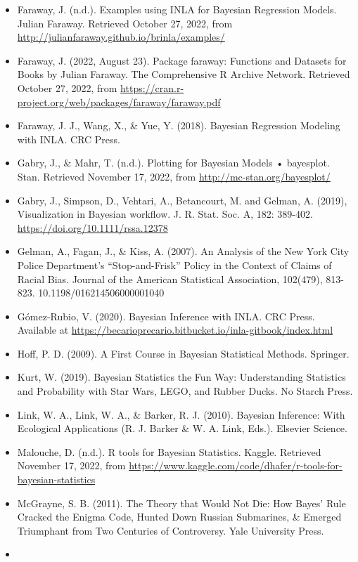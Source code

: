 \documentclass[
]{book}
\begin{document}
\begin{itemize}
\item
  Faraway, J. (n.d.). Examples using INLA for Bayesian Regression Models. Julian Faraway. Retrieved October 27, 2022, from \url{http://julianfaraway.github.io/brinla/examples/}
\item
  Faraway, J. (2022, August 23). Package faraway: Functions and Datasets for Books by Julian Faraway. The Comprehensive R Archive Network. Retrieved October 27, 2022, from \url{https://cran.r-project.org/web/packages/faraway/faraway.pdf}
\item
  Faraway, J. J., Wang, X., \& Yue, Y. (2018). Bayesian Regression Modeling with INLA. CRC Press.
\item
  Gabry, J., \& Mahr, T. (n.d.). Plotting for Bayesian Models • bayesplot. Stan. Retrieved November 17, 2022, from \url{http://mc-stan.org/bayesplot/}
\item
  Gabry, J., Simpson, D., Vehtari, A., Betancourt, M. and Gelman, A. (2019), Visualization in Bayesian workflow. J. R. Stat. Soc. A, 182: 389-402. \url{https://doi.org/10.1111/rssa.12378}
\item
  Gelman, A., Fagan, J., \& Kiss, A. (2007). An Analysis of the New York City Police Department's ``Stop-and-Frisk'' Policy in the Context of Claims of Racial Bias. Journal of the American Statistical Association, 102(479), 813-823. 10.1198/016214506000001040
\item
  Gómez-Rubio, V. (2020). Bayesian Inference with INLA. CRC Press. Available at \url{https://becarioprecario.bitbucket.io/inla-gitbook/index.html}
\item
  Hoff, P. D. (2009). A First Course in Bayesian Statistical Methods. Springer.
\item
  Kurt, W. (2019). Bayesian Statistics the Fun Way: Understanding Statistics and Probability with Star Wars, LEGO, and Rubber Ducks. No Starch Press.
\item
  Link, W. A., Link, W. A., \& Barker, R. J. (2010). Bayesian Inference: With Ecological Applications (R. J. Barker \& W. A. Link, Eds.). Elsevier Science.
\item
  Malouche, D. (n.d.). R tools for Bayesian Statistics. Kaggle. Retrieved November 17, 2022, from \url{https://www.kaggle.com/code/dhafer/r-tools-for-bayesian-statistics}
\item
  McGrayne, S. B. (2011). The Theory that Would Not Die: How Bayes' Rule Cracked the Enigma Code, Hunted Down Russian Submarines, \& Emerged Triumphant from Two Centuries of Controversy. Yale University Press.
\item

\end{itemize}
\end{document}
